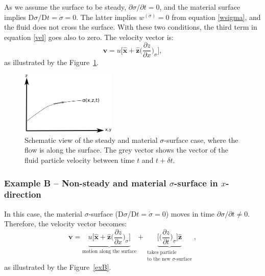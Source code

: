 As we assume the surface to be steady, $\partial \sigma/ \partial t = 0$, and the material surface implies $\mathrm{D}\sigma/\mathrm{D}t = \dot{\sigma} = 0$. The latter implies $w^{(\dot{\sigma})} = 0$ from equation \eqref{wsigma}, and the fluid does not cross the surface. With these two conditions, the third term in equation \eqref{vel} goes also to zero. The velocity vector is:
\begin{equation}
\boldsymbol{v} =  u\bigg [\boldsymbol{\hat{x}} + \boldsymbol{\hat{z}}  \bigg (\frac{\partial z}{\partial x} \bigg )_\sigma \bigg] ,
\end{equation}
as illustrated by the Figure~\ref{exA}.

\begin{figure}[h!]
	\centering
	\includegraphics[width=0.4\textwidth]{figures/lecture13_exampleA.png}
	\caption{Schematic view of the steady and material $\sigma$-surface case, where the flow is along the surface. The grey vector shows the vector of the fluid particle velocity between time $t$ and $t+\delta t$.}
	\label{exA}
\end{figure}

\subsubsection*{Example B -- Non-steady and material $\sigma$-surface in $x$-direction} 


In this case, the material $\sigma$-surface ($\mathrm{D}\sigma/\mathrm{D}t = \dot{\sigma} = 0$) moves in time $\partial \sigma / \partial t \neq 0$. Therefore, the velocity vector becomes:
\begin{equation}
\boldsymbol{v} = \underbrace{u\bigg [\boldsymbol{\hat{x}} + \boldsymbol{\hat{z}}  \bigg (\frac{\partial z}{\partial x} \bigg )_\sigma \bigg]}_\text{motion along the surface}
	+ \underbrace{\bigg [ \bigg (\frac{\partial z}{\partial t}\bigg )_\sigma \bigg]\boldsymbol{\hat{z}}}_{\substack{\text{takes particle}\\\text{to the new $\sigma$-surface}}} ,
\end{equation}
as illustrated by the Figure~\ref{exB}.


